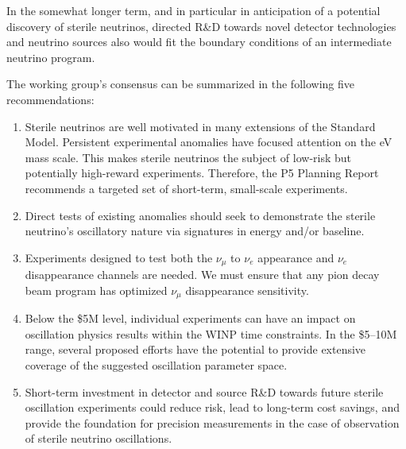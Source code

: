 In the somewhat longer term, and in particular in anticipation of a
potential discovery of sterile neutrinos, directed R\&D towards novel
detector technologies and neutrino sources also would fit the boundary
conditions of an intermediate neutrino program.

The working group's consensus can be summarized in the following five
recommendations:
\begin{enumerate}
\item{Sterile neutrinos are well motivated in many extensions of the
  Standard Model.  Persistent experimental anomalies have focused
  attention on the eV mass scale.  This makes sterile neutrinos the
  subject of low-risk but potentially high-reward experiments.
  Therefore, the P5 Planning Report recommends a targeted set of
  short-term, small-scale experiments.}
\item{Direct tests of existing anomalies should seek to demonstrate
  the sterile neutrino's oscillatory nature via signatures in energy
  and/or baseline.}
\item{Experiments designed to test both the $\nu_{\mu}$ to $\nu_e$
  appearance and $\nu_e$ disappearance channels are needed.  We must
  ensure that any pion decay beam program has optimized $\nu_{\mu}$
  disappearance sensitivity.}
\item{Below the \$5M level, individual experiments can have an impact on
  oscillation physics results within the WINP time constraints.  In
  the \$5--10M range, several proposed efforts have the potential to
  provide extensive coverage of the suggested oscillation parameter
  space.}
\item{Short-term investment in detector and source R\&D towards future
  sterile oscillation experiments could reduce risk, lead to long-term
  cost savings, and provide the foundation for precision measurements
  in the case of observation of sterile neutrino oscillations.}
\end{enumerate}

